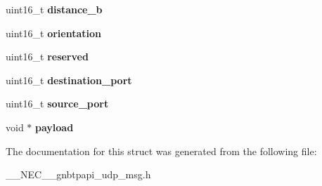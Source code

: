 \begin{DoxyCompactItemize}
\item 
\hypertarget{struct____NEC____gnbtpapi__geocast__rx__header_a2b13f05436f656cc644891856d6618ec}{uint16\-\_\-t {\bfseries distance\-\_\-b}}\label{struct____NEC____gnbtpapi__geocast__rx__header_a2b13f05436f656cc644891856d6618ec}

\item 
\hypertarget{struct____NEC____gnbtpapi__geocast__rx__header_acfd5de5107c6cbdb9082069c694a1d05}{uint16\-\_\-t {\bfseries orientation}}\label{struct____NEC____gnbtpapi__geocast__rx__header_acfd5de5107c6cbdb9082069c694a1d05}

\item 
\hypertarget{struct____NEC____gnbtpapi__geocast__rx__header_a791f90f41e049e99169ff411ae185d0c}{uint16\-\_\-t {\bfseries reserved}}\label{struct____NEC____gnbtpapi__geocast__rx__header_a791f90f41e049e99169ff411ae185d0c}

\item 
\hypertarget{struct____NEC____gnbtpapi__geocast__rx__header_a2bd13d2572afc0dc5e1cb709d49a1278}{uint16\-\_\-t {\bfseries destination\-\_\-port}}\label{struct____NEC____gnbtpapi__geocast__rx__header_a2bd13d2572afc0dc5e1cb709d49a1278}

\item 
\hypertarget{struct____NEC____gnbtpapi__geocast__rx__header_a7615845afe4f258c7c6f007f2eb68c28}{uint16\-\_\-t {\bfseries source\-\_\-port}}\label{struct____NEC____gnbtpapi__geocast__rx__header_a7615845afe4f258c7c6f007f2eb68c28}

\item 
\hypertarget{struct____NEC____gnbtpapi__geocast__rx__header_a802f8901da694bc48ea9604ac06cd236}{void $\ast$ {\bfseries payload}}\label{struct____NEC____gnbtpapi__geocast__rx__header_a802f8901da694bc48ea9604ac06cd236}

\end{DoxyCompactItemize}


\-The documentation for this struct was generated from the following file\-:\begin{DoxyCompactItemize}
\item 
\-\_\-\-\_\-\-N\-E\-C\-\_\-\-\_\-gnbtpapi\-\_\-udp\-\_\-msg.\-h\end{DoxyCompactItemize}
